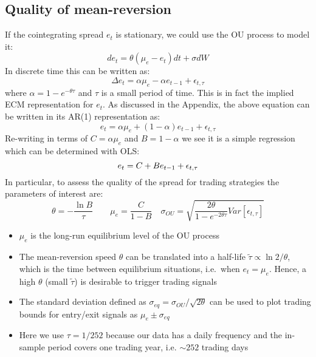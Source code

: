 \documentclass[11pt]{article}
\begin{document}
    \subsection{Quality of mean-reversion}\label{quality-of-mean-reversion}
If the cointegrating spread \(e_t\) is stationary, we could use the OU
process to model it:
\begin{equation}
d e_t = \theta (\mu_e - e_t) dt + \sigma dW
\end{equation}
In discrete time this can be written as:
\begin{equation} 
\Delta e_t = \alpha \mu_e - \alpha e_{t-1} + \epsilon_{t, \tau}
\end{equation}
where \(\alpha= 1 - e^{-\theta \tau}\) and \(\tau\) is a small period of
time. This is in fact the implied ECM representation for \(e_t\). As
discussed in the Appendix, the above equation can be written in its
AR(1) representation as:
\begin{equation}
e_t = \alpha \mu_e + (1-\alpha)e_{t-1} + \epsilon_{t, \tau}
\end{equation}
Re-writing in terms of \(C = \alpha \mu_e\) and \(B=1-\alpha\) we see it
is a simple regression which can be determined with OLS:
\begin{equation} 
e_t = C + B e_{t-1} + \epsilon_{t, \tau} \\
\end{equation}
In particular, to assess the quality of the spread for trading
strategies the parameters of interest are:
\begin{equation}
\theta = -\frac{\ln B}{\tau} \qquad \mu_e = \frac{C}{1-B} 
\quad \sigma_{OU} = \sqrt{\frac{2 \theta}{1-e^{-2\theta \tau}} Var[\epsilon_{t, \tau}]}
\end{equation}
\begin{itemize}
\item
  \(\mu_e\) is the long-run equilibrium level of the OU process
\item
  The mean-reversion speed \(\theta\) can be translated into a half-life
  $\tilde{\tau} \propto \ln 2 / \theta $, which is the time between
  equilibrium situations, i.e.~when \(e_t = \mu_e\). Hence, a high
  \(\theta\) (small \(\tilde{\tau}\)) is desirable to trigger trading
  signals
\item
  The standard deviation defined as
  \(\sigma_{eq} = \sigma_{OU} / \sqrt{2 \theta}\) can be used to plot
  trading bounds for entry/exit signals as \(\mu_e \pm \sigma_{eq}\)
\item
  Here we use \(\tau = 1/252\) because our data has a daily frequency and
  the in-sample period covers one trading year, i.e. \(\sim 252\) trading
  days
\end{itemize}
\end{document}
